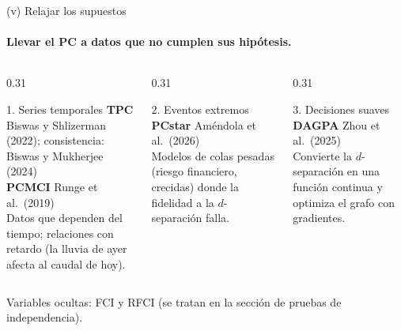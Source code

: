 \documentclass[aspectratio=169,11pt]{beamer}
\begin{document}
\begin{frame}[t]{(v) Relajar los supuestos}
  \framesubtitle{Llevar el PC a datos que no cumplen sus hipótesis.}
  \vspace{0.1cm}
  \begin{columns}[T,onlytextwidth]
    \begin{column}{0.31\textwidth}
      \begin{block}{1. Series temporales}
        {\small\textbf{TPC} \textperiodcentered{} Biswas y Shlizerman (2022);
        consistencia: Biswas y Mukherjee (2024)\\
        \textbf{PCMCI} \textperiodcentered{} Runge et al.\ (2019)}\\[0.15cm]
        Datos que dependen del tiempo; relaciones con retardo (la lluvia de
        ayer afecta al caudal de hoy).
      \end{block}
    \end{column}
    \begin{column}{0.31\textwidth}
      \begin{block}{2. Eventos extremos}
        {\small\textbf{PCstar} \textperiodcentered{} Améndola et al.\ (2026)}\\[0.15cm]
        Modelos de colas pesadas (riesgo financiero, crecidas) donde la
        fidelidad a la $d$-separación falla.
      \end{block}
    \end{column}
    \begin{column}{0.31\textwidth}
      \begin{block}{3. Decisiones suaves}
        {\small\textbf{DAGPA} \textperiodcentered{} Zhou et al.\ (2025)}\\[0.15cm]
        Convierte la $d$-separación en una función continua y optimiza el
        grafo con gradientes.
      \end{block}
    \end{column}
  \end{columns}
  \vfill
  {\scriptsize\color{upmgray}Variables ocultas: FCI y RFCI (se tratan en la
  sección de pruebas de independencia).}
\end{frame}
\end{document}
